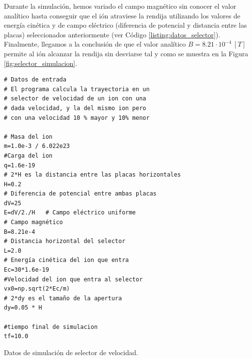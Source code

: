 \documentclass[journal]{IEEEtran}
\newenvironment{code}{\captionsetup{type=listing}}{\par\addvspace{\baselineskip}}
\begin{document}
Durante la simulación, hemos variado el campo magnético sin conocer el valor analítico hasta conseguir que el ión atraviese la rendija utilizando los valores de energía cinética y de campo eléctrico (diferencia de potencial y distancia entre las placas) seleccionados anteriormente (ver Código \ref{listing:datos_selector}). Finalmente, llegamos a la conclusión de que el valor analítico $B = 8.21\cdot 10^{-4}~[T]$ permite al ión alcanzar la rendija sin desviarse tal y como se muestra en la Figura \ref{fig:selector_simulacion}.

\newpage

\begin{code}
    \begin{verbatim}
# Datos de entrada
# El programa calcula la trayectoria en un
# selector de velocidad de un ion con una
# dada velocidad, y la del mismo ion pero
# con una velocidad 10 % mayor y 10% menor

# Masa del ion
m=1.0e-3 / 6.022e23  
#Carga del ion
q=1.6e-19   
# 2*H es la distancia entre las placas horizontales
H=0.2
# Diferencia de potencial entre ambas placas  
dV=25     
E=dV/2./H   # Campo eléctrico uniforme
# Campo magnético
B=8.21e-4  
# Distancia horizontal del selector
L=2.0  
# Energía cinética del ion que entra
Ec=30*1.6e-19  
#Velocidad del ion que entra al selector
vx0=np.sqrt(2*Ec/m)  
# 2*dy es el tamaño de la apertura
dy=0.05 * H 

#tiempo final de simulacion
tf=10.0           
    \end{verbatim}
    \caption{Datos de simulación de selector de velocidad.}
    \label{listing:datos_selector}
\end{code}
\end{document}
